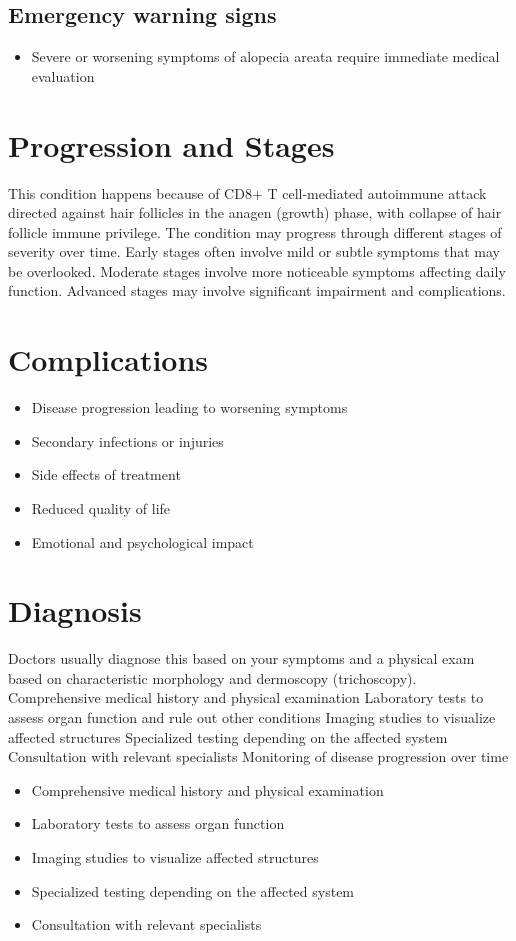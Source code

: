 \subsection{Emergency warning signs}
\begin{itemize}[noitemsep]
  \item Severe or worsening symptoms of alopecia areata require immediate medical evaluation
\end{itemize}
\section{Progression and Stages}
This condition happens because of CD8+ T cell-mediated autoimmune attack directed against hair follicles in the anagen (growth) phase, with collapse of hair follicle immune privilege. The condition may progress through different stages of severity over time. Early stages often involve mild or subtle symptoms that may be overlooked. Moderate stages involve more noticeable symptoms affecting daily function. Advanced stages may involve significant impairment and complications.
\section{Complications}
\begin{itemize}[noitemsep]
  \item Disease progression leading to worsening symptoms
  \item Secondary infections or injuries
  \item Side effects of treatment
  \item Reduced quality of life
  \item Emotional and psychological impact
\end{itemize}
\section{Diagnosis}
Doctors usually diagnose this based on your symptoms and a physical exam based on characteristic morphology and dermoscopy (trichoscopy). Comprehensive medical history and physical examination Laboratory tests to assess organ function and rule out other conditions Imaging studies to visualize affected structures Specialized testing depending on the affected system Consultation with relevant specialists Monitoring of disease progression over time

\begin{itemize}[noitemsep]
  \item Comprehensive medical history and physical examination
  \item Laboratory tests to assess organ function
  \item Imaging studies to visualize affected structures
  \item Specialized testing depending on the affected system
  \item Consultation with relevant specialists
\end{itemize}
